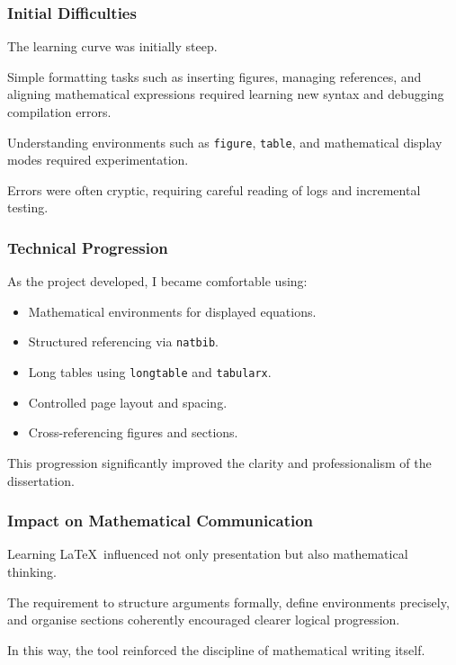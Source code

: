 \documentclass[12pt]{article}
\begin{document}
\subsubsection*{Initial Difficulties}

The learning curve was initially steep.

Simple formatting tasks such as inserting figures, managing references, and aligning mathematical expressions required learning new syntax and debugging compilation errors.

Understanding environments such as \texttt{figure}, \texttt{table}, and mathematical display modes required experimentation.

Errors were often cryptic, requiring careful reading of logs and incremental testing.

\subsubsection*{Technical Progression}

As the project developed, I became comfortable using:

\begin{itemize}
\item Mathematical environments for displayed equations.
\item Structured referencing via \texttt{natbib}.
\item Long tables using \texttt{longtable} and \texttt{tabularx}.
\item Controlled page layout and spacing.
\item Cross-referencing figures and sections.
\end{itemize}

This progression significantly improved the clarity and professionalism of the dissertation.

\subsubsection*{Impact on Mathematical Communication}

Learning \LaTeX\ influenced not only presentation but also mathematical thinking.

The requirement to structure arguments formally, define environments precisely, and organise sections coherently encouraged clearer logical progression.

In this way, the tool reinforced the discipline of mathematical writing itself.
\end{document}
